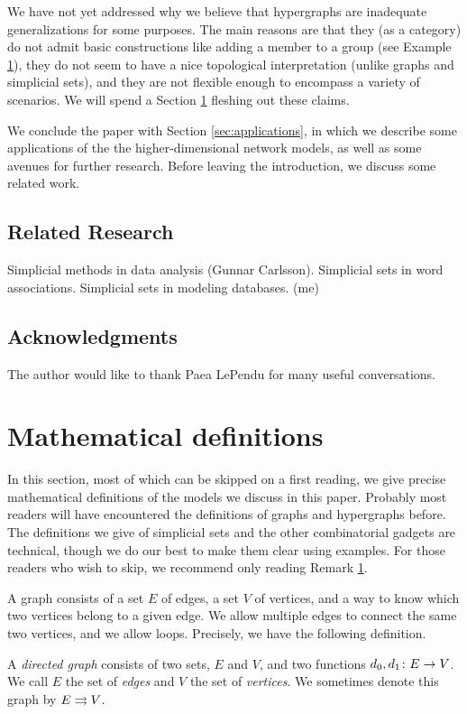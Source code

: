 \documentclass{amsart}
\begin{document}
We have not yet addressed why we believe that hypergraphs are inadequate generalizations for some purposes.  The main reasons are that they (as a category) do not admit basic constructions like adding a member to a group (see Example \ref{}), they do not seem to have a nice topological interpretation (unlike graphs and simplicial sets), and they are not flexible enough to encompass a variety of scenarios.  We will spend a Section \ref{} fleshing out these claims.

We conclude the paper with Section \ref{sec:applications}, in which we describe some applications of the the higher-dimensional network models, as well as some avenues for further research.  Before leaving the introduction, we discuss some related work.

\subsection{Related Research}

Simplicial methods in data analysis (Gunnar Carlsson).
Simplicial sets in word associations.
Simplicial sets in modeling databases. (me)

\subsection{Acknowledgments}

The author would like to thank Paea LePendu for many useful conversations.

\section{Mathematical definitions}

In this section, most of which can be skipped on a first reading, we give precise mathematical definitions of the models we discuss in this paper.  Probably most readers will have encountered the definitions of graphs and hypergraphs before.  The definitions we give of simplicial sets and the other combinatorial gadgets are technical, though we do our best to make them clear using examples.  For those readers who wish to skip, we recommend only reading Remark \ref{}.

A graph consists of a set $E$ of edges, a set $V$ of vertices, and a way to know which two vertices belong to a given edge.  We allow multiple edges to connect the same two vertices, and we allow loops.  Precisely, we have the following definition.

\begin{definition}

A {\em directed graph} consists of two sets, $E$ and $V$, and two functions $d_0,d_1\colon E\rightarrow V$.  We call $E$ the set of {\em edges} and $V$ the set of {\em vertices}.  We sometimes denote this graph by $E\rightrightarrows V$.

\end{definition}
\end{document}
